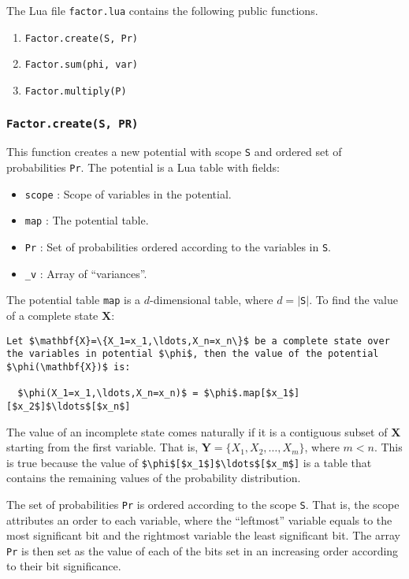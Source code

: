 \documentclass{amsart}
\theoremstyle{plain}
\newcommand{\code}[1]{\lstinline[mathescape=true]{#1}}
\newcommand{\mcode}[1]{\lstinline[mathescape]!#1!}
\begin{document}
The Lua file \code{factor.lua} contains the following public functions.

\begin{enumerate}
  \item\label{factor_create} \code{Factor.create(S, Pr)}
  \item\label{factor_sum} \code{Factor.sum(phi, var)}
  \item\label{factor_multiply} \code{Factor.multiply(P)}
\end{enumerate}

\subsubsection{\code{Factor.create(S, PR)}}

This function creates a new potential with scope \code{S} and ordered set of probabilities
\code{Pr}. The potential is a Lua table with fields:

\begin{itemize}
  \item \code{scope} : Scope of variables in the potential.
  \item \code{map} : The potential table.
  \item \code{Pr} : Set of probabilities ordered according to the variables in \code{S}.
  \item \code{_v} : Array of ``variances''.
\end{itemize}

The potential table \code{map} is a $d$-dimensional table, where $d=|$\code{S}$|$. To find the
value of a complete state $\mathbf{X}$:

\begin{lstlisting}[mathescape=true]
  Let $\mathbf{X}=\{X_1=x_1,\ldots,X_n=x_n\}$ be a complete state over the variables in potential $\phi$, then the value of the potential $\phi(\mathbf{X})$ is:

  $\phi(X_1=x_1,\ldots,X_n=x_n)$ = $\phi$.map[$x_1$][$x_2$]$\ldots$[$x_n$]
\end{lstlisting}

The value of an incomplete state comes naturally if it is a contiguous subset of $\mathbf{X}$
starting from the first variable. That is, $\mathbf{Y}=\{X_1,X_2,\ldots,X_m\}$, where $m<n$. This
is true because the value of \mcode{$\phi$[$x_1$]$\ldots$[$x_m$]} is a table that contains the
remaining values of the probability distribution.

The set of probabilities \code{Pr} is ordered according to the scope \code{S}. That is, the scope
attributes an order to each variable, where the ``leftmost'' variable equals to the most
significant bit and the rightmost variable the least significant bit. The array \code{Pr} is then
set as the value of each of the bits set in an increasing order according to their bit
significance.
\end{document}
